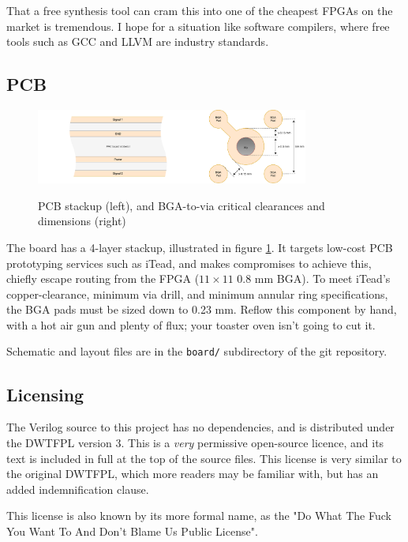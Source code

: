 \documentclass[notitlepage]{article}
\begin{document}
That a free synthesis tool can cram this into one of the cheapest FPGAs on the market is tremendous. I hope for a situation like software compilers, where free tools such as GCC and LLVM are industry standards.

\subsection{PCB}


\begin{figure}[!htb]
\centering
\caption{PCB stackup (left), and BGA-to-via critical clearances and dimensions (right)}
\includegraphics[width=0.8\textwidth]{diagrams/stackup_and_bga.pdf}
\label{diagram:stackup_and_bga}
\end{figure}

The board has a 4-layer stackup, illustrated in figure \ref{diagram:stackup_and_bga}. It targets low-cost PCB prototyping services such as iTead, and makes compromises to achieve this, chiefly escape routing from the FPGA ($11 \times 11$ 0.8 mm BGA). To meet iTead's copper-clearance, minimum via drill, and minimum annular ring specifications, the BGA pads must be sized down to 0.23 mm. Reflow this component by hand, with a hot air gun and plenty of flux; your toaster oven isn't going to cut it.

Schematic and layout files are in the \texttt{board/} subdirectory of the git repository.

\subsection{Licensing}

The Verilog source to this project has no dependencies, and is distributed under the DWTFPL version 3. This is a \textit{very} permissive open-source licence, and its text is included in full at the top of the source files. This license is very similar to the original DWTFPL, which more readers may be familiar with, but has an added indemnification clause.

This license is also known by its more formal name, as the "Do What The Fuck You Want To And Don't Blame Us Public License".
\end{document}
